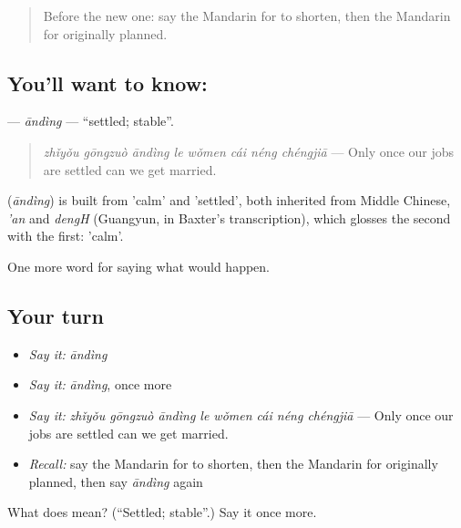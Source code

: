 \label{lesson:ZH-C400-anding}



\begin{quote}
Before the new one: say the Mandarin for to shorten, then the Mandarin for originally planned.
\end{quote}

\subsection*{You'll want to know: }
\textbf{} — \emph{āndìng} — \textquotedblleft{}settled; stable\textquotedblright{}.

\begin{quote}
\textbf{} \emph{zhǐyǒu gōngzuò āndìng le wǒmen cái néng chéngjiā} — Only once our jobs are settled can we get married.
\end{quote}

\begin{cousinweb}
\textbf{} (\emph{āndìng}) is built from  'calm' and  'settled', both inherited from Middle Chinese, \emph{'an} and \emph{dengH} (Guangyun, in Baxter's transcription), which glosses the second with the first: 'calm'.
\end{cousinweb}

\begin{grammarlens}[title={What you've built}]
One more word for saying what would happen.
\end{grammarlens}

\subsection*{Your turn}
\begin{itemize}
\raggedright
  \item \emph{Say it:} \emph{āndìng}
  \item \emph{Say it:} \emph{āndìng}, once more
  \item \emph{Say it:} \emph{zhǐyǒu gōngzuò āndìng le wǒmen cái néng chéngjiā} — Only once our jobs are settled can we get married.
  \item \emph{Recall:} say the Mandarin for to shorten, then the Mandarin for originally planned, then say \emph{āndìng} again
\end{itemize}

\begin{tcolorbox}[breakable,colback=teal!4,colframe=teal!35!black,title={Before you move on}]
What does  mean? (\textquotedblleft{}Settled; stable\textquotedblright{}.) Say it once more.
\end{tcolorbox}
